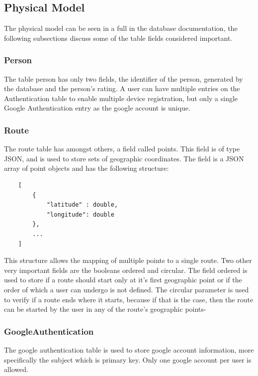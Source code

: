     \subsection{Physical Model}
    The physical model can be seen in a full in the database documentation\cite{servicedbms}, the following subsections discuss 
    some of the table fields considered important.

        \subsubsection*{Person}
        The table person has only two fields, the identifier of the person, generated by the database and the person's rating.
        A user can have multiple entries on the Authentication table to enable multiple device registration, 
        but only a single Google Authentication entry as the google account is unique.

        \subsubsection*{Route}
        The route table has amongst others, a field called points. This field is of type JSON, and is used to store sets of geographic
        coordinates. The field is a JSON array of point objects and has the following structure:
            \begin{lstlisting}
    [    
        {
            "latitude" : double,
            "longitude": double
        },
        ...
    ]
            \end{lstlisting}
        This structure allows the mapping of multiple points to a single route.
        Two other very important fields are the booleans ordered and circular. The field ordered is used to store if a route should start only at it's first geographic
        point or if the order of which a user can undergo is not defined. The circular parameter is used to verify if a route ends where it starts,
        because if that is the case, then the route can be started by the user in any of the route's geographic points-

        \subsubsection*{GoogleAuthentication}
        The google authentication table is used to store google account information, more specifically the subject which is primary
        key. Only one google account per user is allowed.

